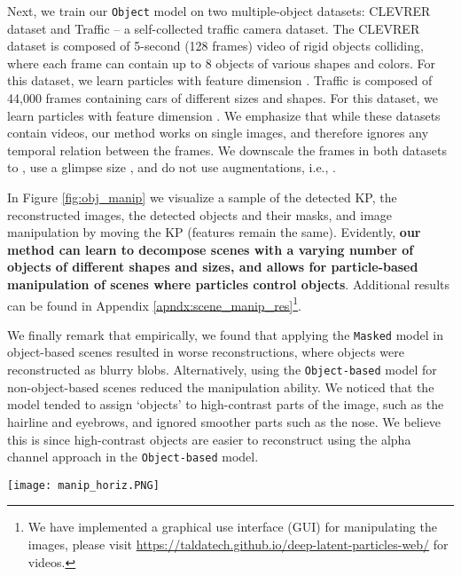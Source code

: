 \documentclass[nohyperref]{article}
\theoremstyle{plain}
\theoremstyle{definition}
\theoremstyle{remark}
\begin{document}
Next, we train our \texttt{Object} model on two multiple-object datasets: CLEVRER~\citep{yi2019clevrer} dataset and Traffic -- a self-collected traffic camera dataset. The CLEVRER dataset is composed of 5-second (128 frames) video of rigid objects colliding, where each frame can contain up to 8 objects of various shapes and colors. For this dataset, we learn  particles with feature dimension . Traffic is composed of 44,000 frames containing cars of different sizes and shapes. For this dataset, we learn  particles with feature dimension .
We emphasize that while these datasets contain videos, our method works on single images, and therefore ignores any temporal relation between the frames. We downscale the frames in both datasets to , use a glimpse size , and do not use augmentations, i.e., .


In Figure \ref{fig:obj_manip} we visualize a sample of the detected KP, the reconstructed images, the detected objects and their masks, and image manipulation by moving the KP (features remain the same).
Evidently, \textbf{our method can learn to decompose scenes with a varying number of objects of different shapes and sizes, and allows for particle-based manipulation of scenes where particles control objects}. 
Additional results can be found in Appendix \ref{apndx:scene_manip_res}\footnote{We have implemented a graphical use interface (GUI) for manipulating the images, please visit \url{https://taldatech.github.io/deep-latent-particles-web/} for videos. }.

We finally remark that empirically, we found that applying the \texttt{Masked} model in object-based scenes resulted in worse reconstructions, where objects were reconstructed as blurry blobs. 
Alternatively, using the \texttt{Object-based}  model
for non-object-based scenes reduced the manipulation ability. We noticed
that the model tended to assign `objects' to high-contrast parts of the image, such as the hairline and eyebrows, and ignored smoother parts such as the nose. We believe this is since high-contrast objects are easier to reconstruct using the alpha channel approach in the \texttt{Object-based}  model.


\begin{figure*}
     \centering
     \texttt{[image: manip\_horiz.PNG]}
        \caption{Scene decomposition and manipulation with  \texttt{Object} model. Left - CLEVRER, right - Traffic. We show the detected particles, the reconstructed images, the objects and masks -- output of the glimpse decoder, and image manipulation based on moving the particles.}
        \label{fig:obj_manip}
\end{figure*}
\end{document}
